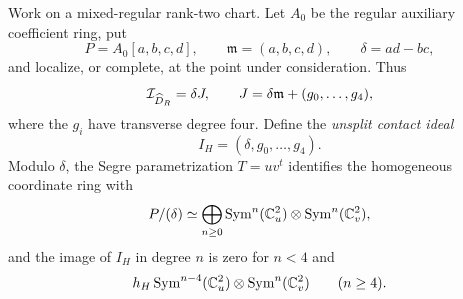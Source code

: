 Work on a mixed-regular rank-two chart.  Let \(A_0\) be the regular
auxiliary coefficient ring, put
\[
 P=A_0[a,b,c,d],\qquad
 \mathfrak m=(a,b,c,d),\qquad
 \delta=ad-bc,
\]
and localize, or complete, at the point under consideration.  Thus
\[
 \mathcal I_{\widehat D_R}=\delta J,\qquad
 J=\delta\mathfrak m+(g_0,\ldots,g_4),
\]
where the \(g_i\) have transverse degree four.  Define the
\emph{unsplit contact ideal}
\begin{equation}\label{eq:contact-saturated-ideal}
 I_H=(\delta,g_0,\ldots,g_4).
\end{equation}
Modulo \(\delta\), the Segre parametrization \(T=uv^t\) identifies
the homogeneous coordinate ring with
\[
 P/(\delta)
 \simeq
 \bigoplus_{n\ge0}
 \operatorname{Sym}^n(\mathbb C^2_u)\otimes\operatorname{Sym}^n(\mathbb C^2_v),
\]
and the image of \(I_H\) in degree \(n\) is zero for \(n<4\) and
\begin{equation}\label{eq:contact-graded-sections}
 h_H\operatorname{Sym}^{n-4}(\mathbb C^2_u)\otimes\operatorname{Sym}^n(\mathbb C^2_v)
 \qquad(n\ge4).
\end{equation}

